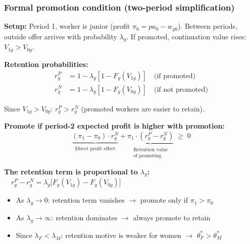 \documentclass[aspectratio=169, 11pt]{beamer}
\begin{document}
\begin{frame}[label=foc-formal]
\frametitle{Formal promotion condition (two-period simplification)}

\small
\textbf{Setup:} Period 1, worker is junior (profit $\pi_0 = pa_0 - w_{g0}$). Between periods, outside offer arrives with probability $\lambda_g$. If promoted, continuation value rises: $V_{1g} > V_{0g}$.

\vspace{0.1cm}
\textbf{Retention probabilities:}
\vspace{-0.1cm}
\begin{align*}
    r_g^P &= 1 - \lambda_g[1 - F_g(V_{1g})] \quad \text{(if promoted)} \\
    r_g^N &= 1 - \lambda_g[1 - F_g(V_{0g})] \quad \text{(if not promoted)}
\end{align*}

\vspace{-0.2cm}
Since $V_{1g} > V_{0g}$: $r_g^P > r_g^N$ (promoted workers are easier to retain).

\vspace{0.1cm}
\textbf{Promote if period-2 expected profit is higher with promotion:}
\begin{equation*}
    \underbrace{(\pi_1 - \pi_0) \cdot r_g^N}_{\substack{\text{Direct profit effect}}} + \underbrace{\pi_1 \cdot (r_g^P - r_g^N)}_{\substack{\text{Retention value} \\ \text{of promoting}}} \;\geq\; 0
\end{equation*}

\vspace{0.1cm}
\textbf{The retention term is proportional to $\lambda_g$:}
$\quad r_g^P - r_g^N = \lambda_g \bigl[F_g(V_{1g}) - F_g(V_{0g})\bigr]$

\vspace{0.1cm}
\begin{itemize}
    \item As $\lambda_g \to 0$: retention term vanishes $\to$ promote only if $\pi_1 > \pi_0$
    \item As $\lambda_g \to \infty$: retention dominates $\to$ always promote to retain
    \item Since $\lambda_F < \lambda_M$: retention motive is weaker for women $\to$ $\theta_F^* > \theta_M^*$
\end{itemize}

\vfill
\hfill\hyperlink{retentionslide}{}

\end{frame}
\end{document}
